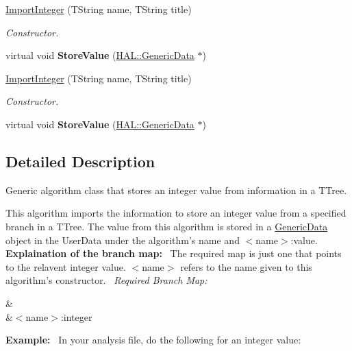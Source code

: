\begin{DoxyCompactItemize}
\item 
\hyperlink{class_h_a_l_1_1_algorithms_1_1_import_integer_a9dbe511f3ff1a3bf1d9a0de66f08da34}{Import\+Integer} (T\+String name, T\+String title)
\begin{DoxyCompactList}\small\item\em Constructor. \end{DoxyCompactList}\item 
\hypertarget{class_h_a_l_1_1_algorithms_1_1_import_integer_a182865e798de3856a85e4339155b8a7f}{virtual void {\bfseries Store\+Value} (\hyperlink{class_h_a_l_1_1_generic_data}{H\+A\+L\+::\+Generic\+Data} $\ast$)}\label{class_h_a_l_1_1_algorithms_1_1_import_integer_a182865e798de3856a85e4339155b8a7f}

\item 
\hyperlink{class_h_a_l_1_1_algorithms_1_1_import_integer_a9dbe511f3ff1a3bf1d9a0de66f08da34}{Import\+Integer} (T\+String name, T\+String title)
\begin{DoxyCompactList}\small\item\em Constructor. \end{DoxyCompactList}\item 
\hypertarget{class_h_a_l_1_1_algorithms_1_1_import_integer_a182865e798de3856a85e4339155b8a7f}{virtual void {\bfseries Store\+Value} (\hyperlink{class_h_a_l_1_1_generic_data}{H\+A\+L\+::\+Generic\+Data} $\ast$)}\label{class_h_a_l_1_1_algorithms_1_1_import_integer_a182865e798de3856a85e4339155b8a7f}

\end{DoxyCompactItemize}


\subsection{Detailed Description}
Generic algorithm class that stores an integer value from information in a T\+Tree. 

This algorithm imports the information to store an integer value from a specified branch in a T\+Tree. The value from this algorithm is stored in a \hyperlink{class_h_a_l_1_1_generic_data}{Generic\+Data} object in the User\+Data under the algorithm's name and $<$name$>$\+:value.~\newline
~\newline
{\bfseries Explaination of the branch map\+:}~\newline
The required map is just one that points to the relavent integer value. $<$name$>$ refers to the name given to this algorithm's constructor.~\newline
{\itshape Required Branch Map\+:} \begin{TabularC}{2}
\hline
{}&\PBS{}\\
&\PBS\centering $<$name$>$\+:integer \\
\end{TabularC}
{\bfseries Example\+:}~\newline
In your analysis file, do the following for an integer value\+:


